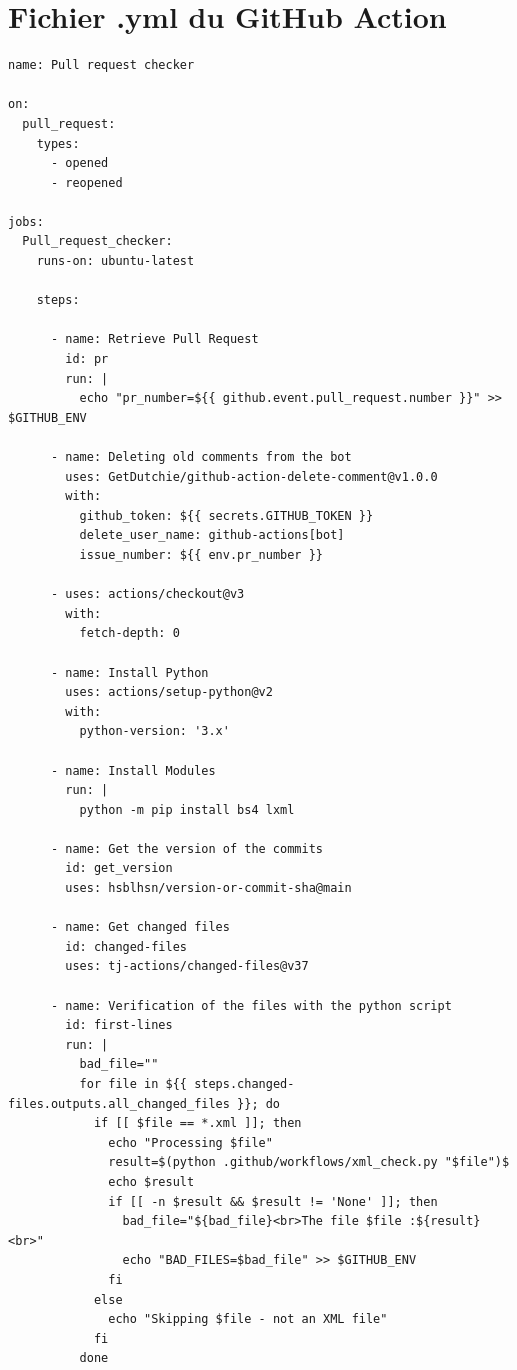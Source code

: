 \section{Fichier .yml du GitHub Action}
\label{git_action}
\begin{lstlisting}[style=YMLStyle, caption=GitHub Action de DiScholEd]
name: Pull request checker

on:
  pull_request:
    types:
      - opened
      - reopened

jobs:
  Pull_request_checker:
    runs-on: ubuntu-latest

    steps:
    
      - name: Retrieve Pull Request
        id: pr
        run: |
          echo "pr_number=${{ github.event.pull_request.number }}" >> $GITHUB_ENV
          
      - name: Deleting old comments from the bot 
        uses: GetDutchie/github-action-delete-comment@v1.0.0
        with: 
          github_token: ${{ secrets.GITHUB_TOKEN }}
          delete_user_name: github-actions[bot]
          issue_number: ${{ env.pr_number }} 

      - uses: actions/checkout@v3
        with:
          fetch-depth: 0

      - name: Install Python
        uses: actions/setup-python@v2
        with:
          python-version: '3.x'

      - name: Install Modules
        run: |
          python -m pip install bs4 lxml

      - name: Get the version of the commits
        id: get_version
        uses: hsblhsn/version-or-commit-sha@main

      - name: Get changed files
        id: changed-files
        uses: tj-actions/changed-files@v37

      - name: Verification of the files with the python script
        id: first-lines
        run: |
          bad_file=""
          for file in ${{ steps.changed-files.outputs.all_changed_files }}; do
            if [[ $file == *.xml ]]; then
              echo "Processing $file"
              result=$(python .github/workflows/xml_check.py "$file")$
              echo $result
              if [[ -n $result && $result != 'None' ]]; then
                bad_file="${bad_file}<br>The file $file :${result}<br>"
                echo "BAD_FILES=$bad_file" >> $GITHUB_ENV
              fi
            else
              echo "Skipping $file - not an XML file"
            fi
          done
      

\end{lstlisting}
